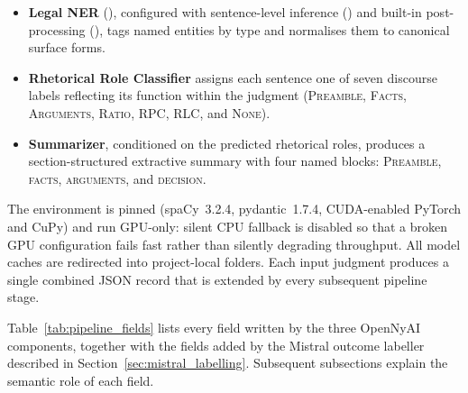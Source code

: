 \begin{itemize}
  \item \textbf{Legal NER} (), configured with
    sentence-level inference () and built-in
    post-processing (), tags named entities by
    type and normalises them to canonical surface forms.
  \item \textbf{Rhetorical Role Classifier} assigns each sentence one of seven
    discourse labels reflecting its function within the judgment
    (\textsc{Preamble}, \textsc{Facts}, \textsc{Arguments}, \textsc{Ratio},
    \textsc{RPC}, \textsc{RLC}, and \textsc{None}).
  \item \textbf{Summarizer}, conditioned on the predicted rhetorical roles,
    produces a section-structured extractive summary with four named blocks:
    \textsc{Preamble}, \textsc{facts}, \textsc{arguments}, and
    \textsc{decision}.
\end{itemize}

The environment is pinned (spaCy~3.2.4, pydantic~1.7.4, CUDA-enabled PyTorch
and CuPy) and run GPU-only: silent CPU fallback is disabled so that a broken GPU
configuration fails fast rather than silently degrading throughput. All model
caches are redirected into project-local folders. Each input judgment produces a
single combined JSON record that is extended by every subsequent pipeline stage.

Table~\ref{tab:pipeline_fields} lists every field written by the three OpenNyAI
components, together with the fields added by the Mistral outcome labeller
described in Section~\ref{sec:mistral_labelling}. Subsequent subsections explain
the semantic role of each field.

